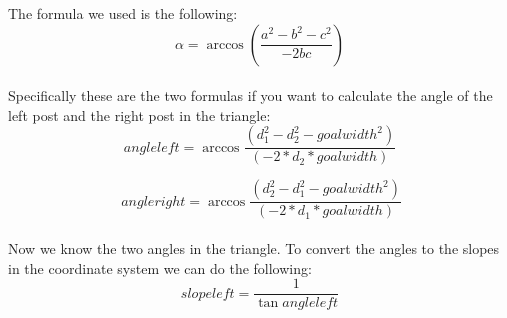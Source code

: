 \documentclass[lnicst,a4paper]{svmultln}
\begin{document}
The formula we used is the following:
\begin{equation}
	\alpha = \arccos{(\frac{a^2-b^2-c^2}{-2bc})}
\end{equation}
\\
Specifically these are the two formulas if you want to calculate the angle of the left post and the right post in the triangle:
\\
\begin{equation}
	angleleft = \arccos{\frac{(d_{1}^2 - d_{2}^2 - goalwidth^2)}{(-2*d_{2}*goalwidth)}}
	\label{equ:angleleft}
\end{equation}

\begin{equation}\
	angleright = \arccos{\frac{(d_{2}^2 - d_{1}^2 - goalwidth^2)}{(-2*d_{1}*goalwidth)}}
	\label{equ:angleright}
\end{equation}
\\
Now we know the two angles in the triangle. To convert the angles to the slopes in the coordinate system we can do the following:\\
\begin{equation}
	slopeleft = \frac{1}{\tan{angleleft}}
	\label{equ:slopeleft}
\end{equation}
\end{document}
